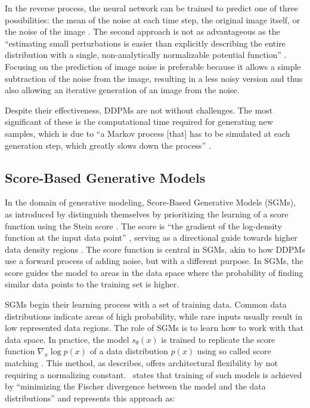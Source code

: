 In the reverse process, the neural network can be trained to predict one of three possibilities: the mean of the noise at each time step, the original image itself, or the noise of the image \citep{hoDDPMs}. The second approach is not as advantageous as the ``estimating small perturbations is easier than explicitly describing the entire distribution with a single, non-analytically normalizable potential function'' \citep{sohlDDPM}. Focusing on the prediction of image noise is preferable because it allows a simple subtraction of the noise from the image, resulting in a less noisy version and thus also allowing an iterative generation of an image from the noise.

Despite their effectiveness, DDPMs are not without challenges. The most significant of these is the computational time required for generating new samples, which is due to ``a Markov process [that] has to be simulated at each generation step, which greatly slows down the process'' \citep{martinez2023understanding}.


\subsection{Score-Based Generative Models}

In the domain of generative modeling, Score-Based Generative Models (SGMs), as introduced by \citeauthor{song2019SGM} distinguish themselves by prioritizing the learning of a score function using the Stein score \citep{steinScore}. The score is ``the gradient of the log-density function at the input data point'' \citep{song2019SGM}, serving as a directional guide towards higher data density regions \citep{song2019SGM}. The score function is central in SGMs, akin to how DDPMs use a forward process of adding noise, but with a different purpose. In SGMs, the score guides the model to areas in the data space where the probability of finding similar data points to the training set is higher.

SGMs begin their learning process with a set of training data. Common data distributions indicate areas of high probability, while rare inputs usually result in low represented data regions. The role of SGMs is to learn how to work with that data space. In practice, the model \(s_\theta(x)\) is trained to replicate the score function \(\nabla_x \log{p(x)}\) of a data distribution \(p(x)\) using so called score matching  \citep{hyvarinenScoreMatching}. This method, as \citeauthor{song2021score} describes, offers architectural flexibility by not requiring a normalizing constant.~\citeauthor{song2021score} states that training of such models is achieved by ``minimizing the Fischer divergence between the model and the data distributions'' and represents this approach as: 

